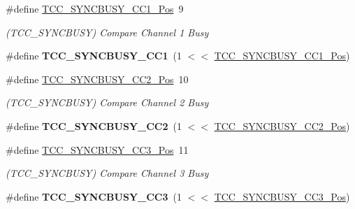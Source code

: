 \begin{DoxyCompactItemize}
\item 
\hypertarget{group___s_a_m_l21___t_c_c_ga44059a22553acf75a3187e227f07f283}{}\#define \hyperlink{group___s_a_m_l21___t_c_c_ga44059a22553acf75a3187e227f07f283}{T\+C\+C\+\_\+\+S\+Y\+N\+C\+B\+U\+S\+Y\+\_\+\+C\+C1\+\_\+\+Pos}~9\label{group___s_a_m_l21___t_c_c_ga44059a22553acf75a3187e227f07f283}

\begin{DoxyCompactList}\small\item\em (T\+C\+C\+\_\+\+S\+Y\+N\+C\+B\+U\+S\+Y) Compare Channel 1 Busy \end{DoxyCompactList}\item 
\hypertarget{group___s_a_m_l21___t_c_c_ga11138deb31c829e178b1634589c2338b}{}\#define {\bfseries T\+C\+C\+\_\+\+S\+Y\+N\+C\+B\+U\+S\+Y\+\_\+\+C\+C1}~(1 $<$$<$ \hyperlink{group___s_a_m_l21___t_c_c_ga44059a22553acf75a3187e227f07f283}{T\+C\+C\+\_\+\+S\+Y\+N\+C\+B\+U\+S\+Y\+\_\+\+C\+C1\+\_\+\+Pos})\label{group___s_a_m_l21___t_c_c_ga11138deb31c829e178b1634589c2338b}

\item 
\hypertarget{group___s_a_m_l21___t_c_c_ga81668e63713a11b2e8479ffee5df4940}{}\#define \hyperlink{group___s_a_m_l21___t_c_c_ga81668e63713a11b2e8479ffee5df4940}{T\+C\+C\+\_\+\+S\+Y\+N\+C\+B\+U\+S\+Y\+\_\+\+C\+C2\+\_\+\+Pos}~10\label{group___s_a_m_l21___t_c_c_ga81668e63713a11b2e8479ffee5df4940}

\begin{DoxyCompactList}\small\item\em (T\+C\+C\+\_\+\+S\+Y\+N\+C\+B\+U\+S\+Y) Compare Channel 2 Busy \end{DoxyCompactList}\item 
\hypertarget{group___s_a_m_l21___t_c_c_gaf0327b51164f298754b1282bb7c7bb74}{}\#define {\bfseries T\+C\+C\+\_\+\+S\+Y\+N\+C\+B\+U\+S\+Y\+\_\+\+C\+C2}~(1 $<$$<$ \hyperlink{group___s_a_m_l21___t_c_c_ga81668e63713a11b2e8479ffee5df4940}{T\+C\+C\+\_\+\+S\+Y\+N\+C\+B\+U\+S\+Y\+\_\+\+C\+C2\+\_\+\+Pos})\label{group___s_a_m_l21___t_c_c_gaf0327b51164f298754b1282bb7c7bb74}

\item 
\hypertarget{group___s_a_m_l21___t_c_c_gab6514a7f89a0369968bfac5c0a5ee699}{}\#define \hyperlink{group___s_a_m_l21___t_c_c_gab6514a7f89a0369968bfac5c0a5ee699}{T\+C\+C\+\_\+\+S\+Y\+N\+C\+B\+U\+S\+Y\+\_\+\+C\+C3\+\_\+\+Pos}~11\label{group___s_a_m_l21___t_c_c_gab6514a7f89a0369968bfac5c0a5ee699}

\begin{DoxyCompactList}\small\item\em (T\+C\+C\+\_\+\+S\+Y\+N\+C\+B\+U\+S\+Y) Compare Channel 3 Busy \end{DoxyCompactList}\item 
\hypertarget{group___s_a_m_l21___t_c_c_ga6ce30a2a0c788c704bd5c3020bbd0a4b}{}\#define {\bfseries T\+C\+C\+\_\+\+S\+Y\+N\+C\+B\+U\+S\+Y\+\_\+\+C\+C3}~(1 $<$$<$ \hyperlink{group___s_a_m_l21___t_c_c_gab6514a7f89a0369968bfac5c0a5ee699}{T\+C\+C\+\_\+\+S\+Y\+N\+C\+B\+U\+S\+Y\+\_\+\+C\+C3\+\_\+\+Pos})\label{group___s_a_m_l21___t_c_c_ga6ce30a2a0c788c704bd5c3020bbd0a4b}


\end{DoxyCompactItemize}
